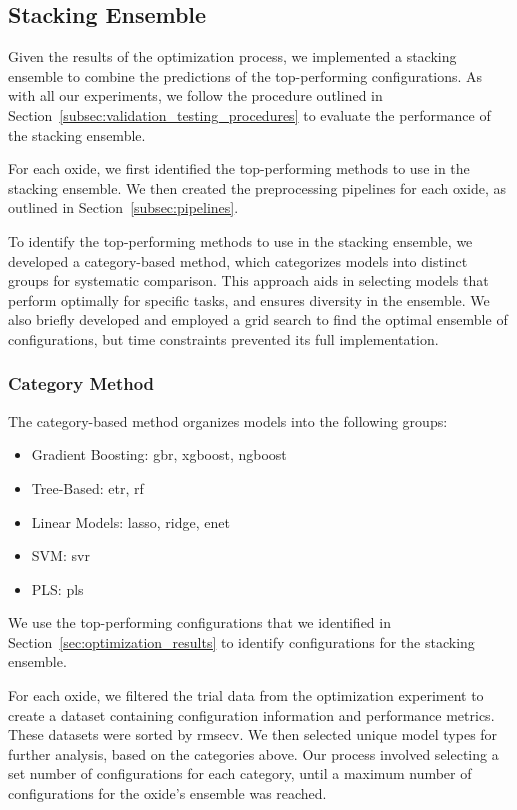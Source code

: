 \subsection{Stacking Ensemble}\label{subsec:stacking_ensemble}
Given the results of the optimization process, we implemented a stacking ensemble to combine the predictions of the top-performing configurations.
As with all our experiments, we follow the procedure outlined in Section~\ref{subsec:validation_testing_procedures} to evaluate the performance of the stacking ensemble.

For each oxide, we first identified the top-performing methods to use in the stacking ensemble.
We then created the preprocessing pipelines for each oxide, as outlined in Section~\ref{subsec:pipelines}.

To identify the top-performing methods to use in the stacking ensemble, we developed a category-based method, which categorizes models into distinct groups for systematic comparison.
This approach aids in selecting models that perform optimally for specific tasks, and ensures diversity in the ensemble.
We also briefly developed and employed a grid search to find the optimal ensemble of configurations, but time constraints prevented its full implementation.

\subsubsection{Category Method}
The category-based method organizes models into the following groups:

\begin{itemize}
    \item Gradient Boosting: \gls{gbr}, \gls{xgboost}, \gls{ngboost}
    \item Tree-Based: \gls{etr}, \gls{rf}
    \item Linear Models: \gls{lasso}, \gls{ridge}, \gls{enet}
    \item SVM: \gls{svr}
    \item PLS: \gls{pls}
\end{itemize}

We use the top-performing configurations that we identified in Section~\ref{sec:optimization_results} to identify configurations for the stacking ensemble.

For each oxide, we filtered the trial data from the optimization experiment to create a dataset containing configuration information and performance metrics.
These datasets were sorted by \gls{rmsecv}.
We then selected unique model types for further analysis, based on the categories above.
Our process involved selecting a set number of configurations for each category, until a maximum number of configurations for the oxide's ensemble was reached.

